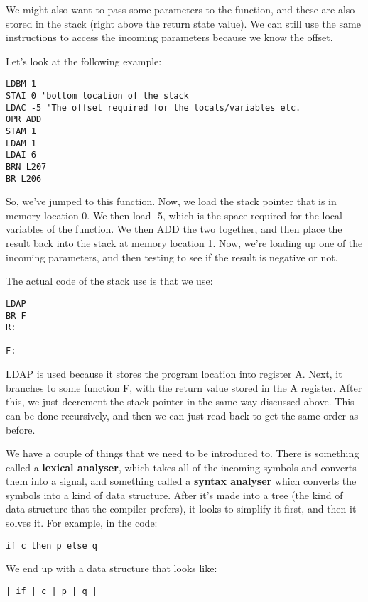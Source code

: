 \documentclass[11pt,a4paper,titlepage,dvipsnames,cmyk]{scrartcl}
\begin{document}
We might also want to pass some parameters to the function, and these are
also stored in the stack (right above the return state value). We can
still use the same instructions to access the incoming parameters because
we know the offset.

Let's look at the following example:
\begin{lstlisting}[]
LDBM 1
STAI 0 'bottom location of the stack
LDAC -5 'The offset required for the locals/variables etc.
OPR ADD
STAM 1
LDAM 1
LDAI 6
BRN L207
BR L206
\end{lstlisting}

So, we've jumped to this function. Now, we load the stack pointer that is
in memory location 0. We then load -5, which is the space required for
the local variables of the function. We then ADD the two together, and
then place the result back into the stack at memory location 1. Now, we're
loading up one of the incoming parameters, and then testing to see if
the result is negative or not.

The actual code of the stack use is that we use:
\begin{lstlisting}[]
LDAP
BR F
R:

F:
\end{lstlisting}

LDAP is used because it stores the program location into register A. Next,
it branches to some function F, with the return value stored in the A
register. After this, we just decrement the stack pointer in the same way
discussed above. This can be done recursively, and then we can just read
back to get the same order as before.

We have a couple of things that we need to be introduced to. There is
something called a \textbf{lexical analyser}, which takes all of the
incoming symbols and converts them into a signal, and something called a
\textbf{syntax analyser}  which converts the symbols into a kind of data
structure. After it's made into a tree (the kind of data structure that
the compiler prefers), it looks to simplify it first, and then it solves
it. For example, in the code:

\begin{lstlisting}[]
if c then p else q
\end{lstlisting}

We end up with a data structure that looks like:

\begin{lstlisting}[]
| if | c | p | q |
\end{lstlisting}
\end{document}
